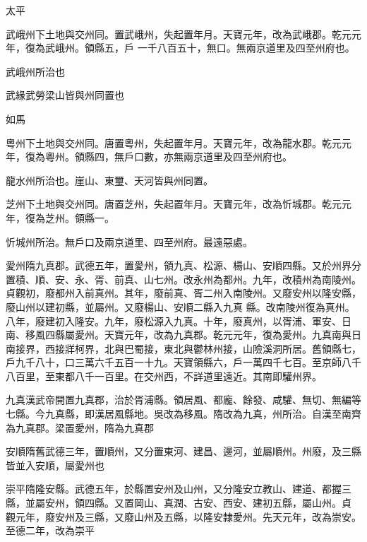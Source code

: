 \begin{pinyinscope}
 太平



 武峨州下土地與交州同。置武峨州，失起置年月。天寶元年，改為武峨郡。乾元元年，復為武峨州。領縣五，戶
 一千八百五十，無口。無兩京道里及四至州府也。



 武峨州所治也



 武緣武勞梁山皆與州同置也



 如馬



 粵州下土地與交州同。唐置粵州，失起置年月。天寶元年，改為龍水郡。乾元元年，復為粵州。領縣四，無戶口數，亦無兩京道里及四至州府也。



 龍水州所治也。崖山、東璽、天河皆與州同置。



 芝州下土地與交州同。唐置芝州，失起置年月。天寶元年，改為忻城郡。乾元元年，復為芝州。領縣一。



 忻城州所治。無戶口及兩京道里、四至州府。最遠惡處。



 愛州隋九真郡。武德五年，置愛州，領九真、松源、楊山、安順四縣。又於州界分置積、順、安、永、胥、前真、山七州。改永州為都州。九年，改積州為南陵州。貞觀初，廢都州入前真州。其年，廢前真、胥二州入南陵州。又廢安州以隆安縣，廢山州以建初縣，並屬州。又廢楊山、安順二縣入九真
 縣。改南陵州復為真州。八年，廢建初入隆安。九年，廢松源入九真。十年，廢真州，以胥浦、軍安、日南、移風四縣屬愛州。天寶元年，改為九真郡。乾元元年，復為愛州。九真南與日南接界，西接牂柯界，北與巴蜀接，東北與鬱林州接，山險溪洞所居。舊領縣七，戶九千八十，口三萬六千五百一十九。天寶領縣六，戶一萬四千七百。至京師八千八百里，至東都八千一百里。在交州西，不詳道里遠近。其南即驩州界。



 九真漢武帝開置九真郡，治於胥浦縣。領居風、都龐、餘發、咸驩、無切、無編等七縣。今九真縣，即漢居風縣地。吳改為移風。隋改為九真，州所治。自漢至南齊為九真郡。梁置愛州，隋為九真郡



 安順隋舊武德三年，置順州，又分置東河、建昌、邊河，並屬順州。州廢，及三縣皆並入安順，屬愛州也



 崇平隋隆安縣。武德五年，於縣置安州及山州，又分隆安立教山、建道、都握三縣，並屬安州，領四縣。又置岡山、真潤、古安、西安、建初五縣，屬山州。貞
 觀元年，廢安州及三縣，又廢山州及五縣，以隆安隸愛州。先天元年，改為崇安。至德二年，改為崇平




\end{pinyinscope}
